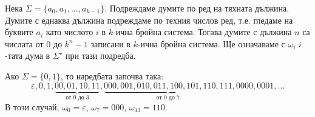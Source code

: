 Нека $\Sigma = \{a_0,a_1,\dots,a_{k-1}\}$.
Подреждаме думите по ред на тяхната дължина.
Думите с еднаква дължина подреждаме по техния числов ред, т.е.
гледаме на буквите $a_i$ като числото $i$ в $k$-ична бройна система.
Тогава думите с дължина $n$ са числата от $0$ до $k^n-1$ записани в $k$-ична бройна система.
Ще означаваме с $\omega_i$ $i$-тата дума в $\Sigma^\star$ при тази подредба.

\begin{example}
  Ако $\Sigma = \{0,1\}$, то наредбата започва така:
  \[\varepsilon, 0, 1, \underbrace{00, 01, 10, 11}_{\text{от $0$ до $3$}}, \underbrace{000, 001, 010, 011, 100, 101, 110, 111}_{\text{от $0$ до $7$}}, 0000, 0001, \dots\]
  В този случай, $\omega_0 = \varepsilon$, $\omega_7 = 000$, $\omega_{13} = 110$.
\end{example}







